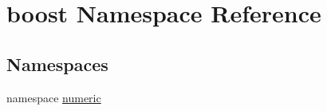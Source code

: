 \hypertarget{namespaceboost}{\section{boost \-Namespace \-Reference}
\label{namespaceboost}
}
\subsection*{\-Namespaces}
\begin{DoxyCompactItemize}
\item 
namespace \hyperlink{namespaceboost_1_1numeric}{numeric}
\end{DoxyCompactItemize}
